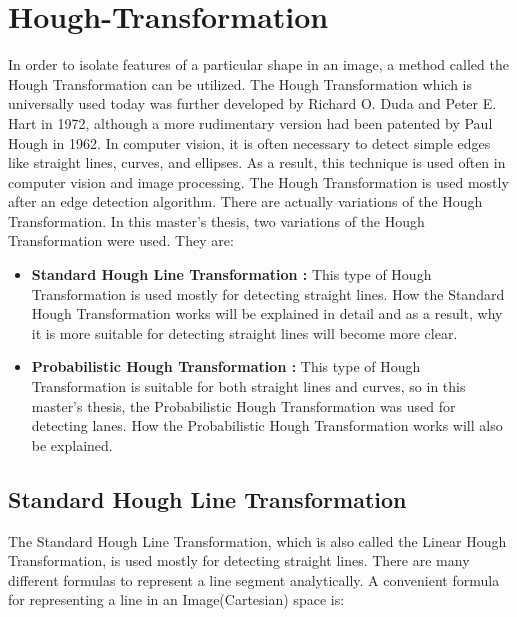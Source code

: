 \section{Hough-Transformation}\label{sec:Hough-Transformation}
%
In order to isolate features of a particular shape in an image, a method called the Hough Transformation can be utilized. The Hough Transformation which is universally used today was further developed by Richard O. Duda and Peter E. Hart in 1972, although a more rudimentary version had been patented by Paul Hough in 1962.\cite{Hough_Transformation} In computer vision, it is often necessary to detect simple edges like straight lines, curves, and ellipses. As a result, this technique is used often in computer vision and image processing. The Hough Transformation is used mostly after an edge detection algorithm. There are actually variations of the Hough Transformation. In this master's thesis, two variations of the Hough Transformation were used. They are:

\begin{itemize}

\item \textbf{Standard Hough Line Transformation : }This type of Hough Transformation is used mostly for detecting straight lines. How the Standard Hough Transformation works will be explained in detail and as a result, why it is more suitable for detecting straight lines will become more clear.

\item \textbf{Probabilistic Hough Transformation : }This type of Hough Transformation is suitable for both straight lines and curves, so in this master's thesis, the Probabilistic Hough Transformation was used for detecting lanes. How the Probabilistic Hough Transformation works will also be explained.

\end{itemize}
%
\subsection{Standard Hough Line Transformation}\label{sec:Standard Hough Line Transformation}
%
The Standard Hough Line Transformation, which is also called the Linear Hough Transformation, is used mostly for detecting straight lines. There are many different formulas to represent a line segment analytically. A convenient formula for representing a line in an Image(Cartesian) space is:

  \begin{center}


  \end{center}
  
